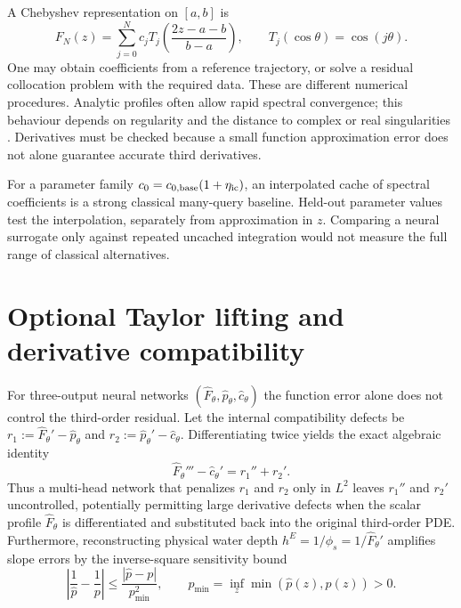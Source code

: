 \documentclass[11pt,a4paper,oneside]{report}
\numberwithin{equation}{chapter}
\begin{document}
A Chebyshev representation on $[a,b]$ is
\begin{equation}
F_N(z)=\sum_{j=0}^N c_jT_j\!\left(\frac{2z-a-b}{b-a}\right),\qquad
T_j(\cos\theta)=\cos(j\theta).
\end{equation}
One may obtain coefficients from a reference trajectory, or solve a residual collocation problem with the required data. These are different numerical procedures. Analytic profiles often allow rapid spectral convergence; this behaviour depends on regularity and the distance to complex or real singularities \cite{trefethen}. Derivatives must be checked because a small function approximation error does not alone guarantee accurate third derivatives.

For a parameter family $c_0=c_{0,\rm base}(1+\eta_{\rm ic})$, an interpolated cache of spectral coefficients is a strong classical many-query baseline. Held-out parameter values test the interpolation, separately from approximation in $z$. Comparing a neural surrogate only against repeated uncached integration would not measure the full range of classical alternatives.

\section{Optional Taylor lifting and derivative compatibility}
For three-output neural networks $(\widehat{F}_\theta,\widehat{p}_\theta,\widehat{c}_\theta)$ the function error alone does not control the third-order residual. Let the internal compatibility defects be $r_1 := \widehat{F}_\theta' - \widehat{p}_\theta$ and $r_2 := \widehat{p}_\theta' - \widehat{c}_\theta$. Differentiating twice yields the exact algebraic identity
\begin{equation}\label{eq:deriv_incompat}
\widehat{F}_\theta''' - \widehat{c}_\theta' = r_1'' + r_2'.
\end{equation}
Thus a multi-head network that penalizes $r_1$ and $r_2$ only in $L^2$ leaves $r_1''$ and $r_2'$ uncontrolled, potentially permitting large derivative defects when the scalar profile $\widehat{F}_\theta$ is differentiated and substituted back into the original third-order PDE. Furthermore, reconstructing physical water depth $h^E = 1/\phi_s = 1/\widehat{F}_\theta'$ amplifies slope errors by the inverse-square sensitivity bound
\begin{equation}
\left|\frac{1}{\widehat{p}} - \frac{1}{p}\right| \le \frac{|\widehat{p}-p|}{p_{\min}^2},\qquad
p_{\min} = \inf_z \min(\widehat{p}(z),p(z)) > 0.
\end{equation}
\end{document}
